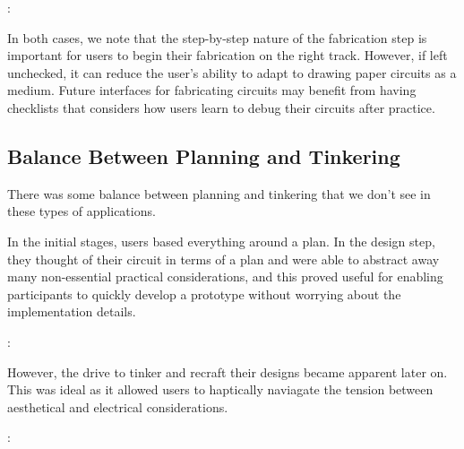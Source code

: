 \documentclass{sigchi}
\begin{document}
  \begin{myquote}
   \vspace{-2pt}
    :
    \vspace{-2pt}
  \end{myquote}
  
  In both cases, we note that the step-by-step nature of the fabrication step is important for users to begin their fabrication on the right track. However, if left unchecked, it can reduce the user's ability to adapt to drawing paper circuits as a medium. Future interfaces for fabricating circuits may benefit from having checklists that considers how users learn to debug their circuits after practice.

  \subsection{Balance Between Planning and Tinkering}
  There was some balance between planning and tinkering that we don't see in these types of applications.
  
  In the initial stages, users based everything around a plan. In the design step, they thought of their circuit in terms of a plan and were able to abstract away many non-essential practical considerations, and this proved useful for enabling participants to quickly develop a prototype without worrying about the implementation details.
  
  \begin{myquote}
   \vspace{-2pt}
    :
    \vspace{-2pt}
  \end{myquote}
  
  However, the drive to tinker and recraft their designs became apparent later on. This was ideal as it allowed users to haptically naviagate the tension between aesthetical and electrical considerations.
  
  \begin{myquote}
   \vspace{-2pt}
    :
    \vspace{-2pt}
  \end{myquote}
  
\end{document}

